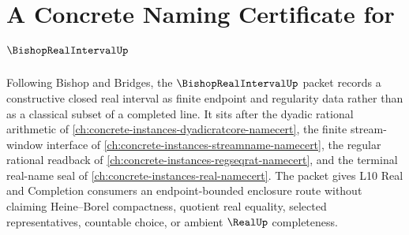 \chapter{A Concrete Naming Certificate for $\BishopRealIntervalUp$}
\label{ch:concrete-instances-bishop-real-interval-namecert}

Following Bishop and Bridges, the $\BishopRealIntervalUp$ packet records a constructive closed real interval as finite endpoint and regularity data rather than as a classical subset of a completed line. It sits after the dyadic rational arithmetic of \autoref{ch:concrete-instances-dyadicratcore-namecert}, the finite stream-window interface of \autoref{ch:concrete-instances-streamname-namecert}, the regular rational readback of \autoref{ch:concrete-instances-regseqrat-namecert}, and the terminal real-name seal of \autoref{ch:concrete-instances-real-namecert}. The packet gives L10 Real and Completion consumers an endpoint-bounded enclosure route without claiming Heine--Borel compactness, quotient real equality, selected representatives, countable choice, or ambient $\RealUp$ completeness.

